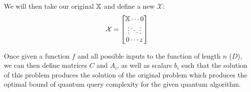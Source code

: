 We will then take our original $\operatorname{\mathbb{X}}$ and define a new $\mathcal{X}$:
\begin{equation}
    \mathcal{X} = \left[\begin{matrix}\operatorname{\mathbb{X}} \cdots 0 \\
                                \vdots \ddots \vdots \\
                                0 \cdots z  \end{matrix} \right]  \nonumber
\end{equation}

\qquad Once given a function $f$ and all possible inputs to the
function of length $n$ ($D$), we can then define matrices $C$ and
$A_i$, as well as scalars $b_i$ such that the solution of this problem
produces the solution of the original problem which produces the
optimal bound of quantum query complexity for the given quantum
algorithm.